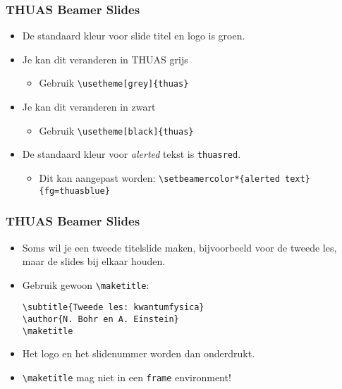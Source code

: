 \documentclass[fleqn,aspectratio=169,dutch,10pt]{beamer}
\begin{document}
\begin{frame}[fragile]
\frametitle{THUAS Beamer Slides}
\begin{itemize}
\item De standaard kleur voor slide titel en logo is groen.
\item Je kan dit veranderen in THUAS grijs
\begin{itemize}
\item Gebruik \lstinline|\usetheme[grey]{thuas}|
\end{itemize}
\item Je kan dit veranderen in zwart
\begin{itemize}
\item Gebruik \lstinline|\usetheme[black]{thuas}|
\end{itemize}
\item De standaard kleur voor \emph{alerted} tekst is \lstinline|thuasred|.
\begin{itemize}
\item Dit kan aangepast worden: \lstinline|\setbeamercolor*{alerted text}{fg=thuasblue}|
\end{itemize}
\end{itemize}
\end{frame}


\begin{frame}[fragile]
\frametitle{THUAS Beamer Slides}
\begin{itemize}
\item Soms wil je een tweede titelslide maken, bijvoorbeeld voor de tweede les, maar de slides bij elkaar houden.
\item Gebruik gewoon \lstinline|\maketitle|:
\begin{lstlisting}
\subtitle{Tweede les: kwantumfysica}
\author{N. Bohr en A. Einstein}
\maketitle
\end{lstlisting}
\item Het logo en het slidenummer worden dan onderdrukt.
\item \lstinline|\maketitle| mag niet in een \lstinline|frame| environment!
\end{itemize}
\end{frame}
\end{document}
